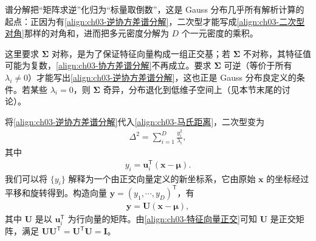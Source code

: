 \documentclass[../../main.tex]{subfiles}
\begin{document}
\begin{remark}
谱分解把“矩阵求逆”化归为“标量取倒数”，这是 Gauss 分布几乎所有解析计算的起点：正因为有\eqref{align:ch03-逆协方差谱分解}，二次型才能写成\eqref{align:ch03-二次型对角}那样的对角和，进而把多元密度分解为 $D$ 个一元密度的乘积。

这里要求 $\boldsymbol{\Sigma}$ 对称，是为了保证特征向量构成一组正交基；若 $\boldsymbol{\Sigma}$ 不对称，其特征值可能为复数，\eqref{align:ch03-协方差谱分解}不再成立。要求 $\boldsymbol{\Sigma}$ 可逆（等价于所有 $\lambda_i\neq0$）才能写出\eqref{align:ch03-逆协方差谱分解}，这也正是 Gauss 分布良定义的条件。若某些 $\lambda_i=0$，则 $\boldsymbol{\Sigma}$ 奇异，分布退化到低维子空间上（见本节末尾的讨论）。
\end{remark}

将\eqref{align:ch03-逆协方差谱分解}代入\eqref{align:ch03-马氏距离}，二次型变为
\begin{align}
\Delta^{2}=\sum_{i=1}^{D}\frac{y_{i}^{2}}{\lambda_{i}},
\label{align:ch03-二次型对角}
\end{align}
其中
\begin{align}
y_{i}=\boldsymbol{u}_{i}^{\mathsf{T}}(\boldsymbol{x}-\boldsymbol{\mu}).
\label{align:ch03-旋转坐标}
\end{align}
我们可以将 $\{y_{i}\}$ 解释为一个由正交向量定义的新坐标系，它由原始 $\boldsymbol{x}$ 的坐标经过平移和旋转得到。构造向量 $\boldsymbol{y}=(y_1,\cdots,y_D)^{\mathsf{T}}$，有
\begin{align}
\boldsymbol{y}=\boldsymbol{U}(\boldsymbol{x}-\boldsymbol{\mu}),
\label{align:ch03-旋转矩阵}
\end{align}
其中 $\boldsymbol{U}$ 是以 $\boldsymbol{u}_{i}^{\mathsf{T}}$ 为行向量的矩阵。由\eqref{align:ch03-特征向量正交}可知 $\boldsymbol{U}$ 是正交矩阵，满足 $\boldsymbol{U}\boldsymbol{U}^{\mathsf{T}}=\boldsymbol{U}^{\mathsf{T}}\boldsymbol{U}=\boldsymbol{I}$。
\end{document}
